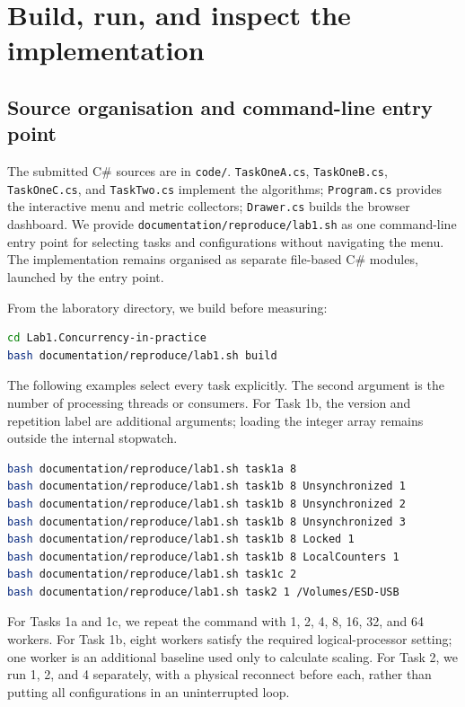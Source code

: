 \chapter{Build, run, and inspect the implementation}
\section{Source organisation and command-line entry point}
The submitted C\# sources are in \texttt{code/}. \texttt{TaskOneA.cs}, \texttt{TaskOneB.cs}, \texttt{TaskOneC.cs}, and \texttt{TaskTwo.cs} implement the algorithms; \texttt{Program.cs} provides the interactive menu and metric collectors; \texttt{Drawer.cs} builds the browser dashboard. We provide \texttt{documentation/reproduce/lab1.sh} as one command-line entry point for selecting tasks and configurations without navigating the menu. The implementation remains organised as separate file-based C\# modules, launched by the entry point.

From the laboratory directory, we build before measuring:
\begin{lstlisting}[language=bash,caption={Preparing the file-based executables.}]
cd Lab1.Concurrency-in-practice
bash documentation/reproduce/lab1.sh build
\end{lstlisting}

The following examples select every task explicitly. The second argument is the number of processing threads or consumers. For Task 1b, the version and repetition label are additional arguments; loading the integer array remains outside the internal stopwatch.
\begin{lstlisting}[language=bash,caption={Examples for all four tasks.}]
bash documentation/reproduce/lab1.sh task1a 8
bash documentation/reproduce/lab1.sh task1b 8 Unsynchronized 1
bash documentation/reproduce/lab1.sh task1b 8 Unsynchronized 2
bash documentation/reproduce/lab1.sh task1b 8 Unsynchronized 3
bash documentation/reproduce/lab1.sh task1b 8 Locked 1
bash documentation/reproduce/lab1.sh task1b 8 LocalCounters 1
bash documentation/reproduce/lab1.sh task1c 2
bash documentation/reproduce/lab1.sh task2 1 /Volumes/ESD-USB
\end{lstlisting}

For Tasks 1a and 1c, we repeat the command with 1, 2, 4, 8, 16, 32, and 64 workers. For Task 1b, eight workers satisfy the required logical-processor setting; one worker is an additional baseline used only to calculate scaling. For Task 2, we run 1, 2, and 4 separately, with a physical reconnect before each, rather than putting all configurations in an uninterrupted loop.

